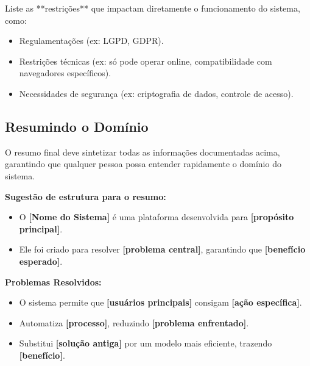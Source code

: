 Liste as **restrições** que impactam diretamente o funcionamento do sistema, como:  
\begin{itemize}
    \item Regulamentações (ex: LGPD, GDPR).
    \item Restrições técnicas (ex: só pode operar online, compatibilidade com navegadores específicos).
    \item Necessidades de segurança (ex: criptografia de dados, controle de acesso).
\end{itemize}

\subsection{Resumindo o Domínio}


O resumo final deve sintetizar todas as informações documentadas acima, garantindo que qualquer pessoa possa entender rapidamente o domínio do sistema.  

\textbf{Sugestão de estrutura para o resumo:}
\begin{itemize}
    \item O \textbf{[Nome do Sistema]} é uma plataforma desenvolvida para \textbf{[propósito principal]}.
    \item Ele foi criado para resolver \textbf{[problema central]}, garantindo que \textbf{[benefício esperado]}.
\end{itemize}

\textbf{Problemas Resolvidos:}
\begin{itemize}
    \item O sistema permite que \textbf{[usuários principais]} consigam \textbf{[ação específica]}.
    \item Automatiza \textbf{[processo]}, reduzindo \textbf{[problema enfrentado]}.
    \item Substitui \textbf{[solução antiga]} por um modelo mais eficiente, trazendo \textbf{[benefício]}.
\end{itemize}

